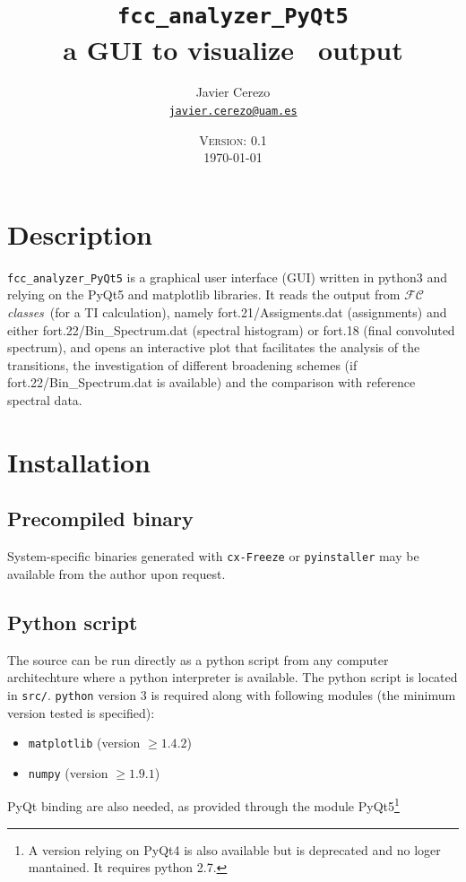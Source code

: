 \documentclass[a4paper,11pt]{article}
\title{\texttt{fcc\_analyzer\_PyQt5}\\ a GUI to visualize \fcc\ output}
\date{\textsc{Version: 0.1}\\\today}
\author{Javier Cerezo\\\href{mailto:javier.cerezo@uam.es}{\texttt{javier.cerezo@uam.es}}}
\begin{document}
\setlength{\parskip}{0.5em}
\newcommand{\fcc}{$\mathcal{FC}$\textit{classes}}

\maketitle

\section{Description}
\texttt{fcc\_analyzer\_PyQt5} is a graphical user interface (GUI) written in python3 and relying on the PyQt5 and matplotlib libraries. It reads the output from \fcc\ (for a TI calculation), namely fort.21/Assigments.dat (assignments) and either fort.22/Bin\_Spectrum.dat (spectral histogram) or fort.18 (final convoluted spectrum), and opens an interactive plot that facilitates the analysis of the transitions, the investigation of different broadening schemes (if fort.22/Bin\_Spectrum.dat is available) and the comparison with reference spectral data.

\section{Installation}

\subsection{Precompiled binary}
System-specific binaries generated with \texttt{cx-Freeze} or \texttt{pyinstaller} may be available from the author upon request.

\subsection{Python script}
The source can be run directly as a python script from any computer architechture where a python interpreter is available. The python script is located in \texttt{src/}. \texttt{python} version 3 is required along with following modules (the minimum version tested is specified):

\begin{itemize}
 \item \texttt{matplotlib} (version $\geq1.4.2$)
 \item \texttt{numpy} (version $\geq1.9.1$)
\end{itemize}

PyQt binding are also needed, as provided through the module PyQt5\footnote{A version relying on PyQt4 is also available but is deprecated and no loger mantained. It requires python 2.7.}
\end{document}
